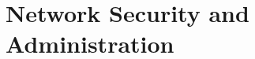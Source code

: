 \documentclass[../main.tex]{subfiles}
\begin{document}
\chapter{Network Security and Administration}
\label{ch:network-security-administration}

\end{document}
